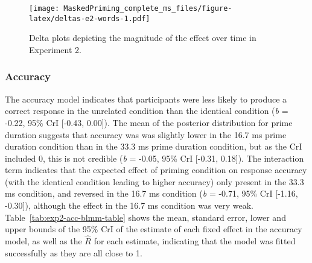 \documentclass[
  english,
  man,floatsintext]{apa6}
\begin{document}
\begin{figure}
\centering
\texttt{[image: MaskedPriming\_complete\_ms\_files/figure-latex/deltas-e2-words-1.pdf]}
\caption{\label{fig:deltas-e2-words}Delta plots depicting the magnitude of the effect over time in Experiment 2.}
\end{figure}

\hypertarget{accuracy-1}{%
\subsubsection{Accuracy}\label{accuracy-1}}

The accuracy model indicates that participants were less likely to produce a correct response in the unrelated condition than the identical condition (\emph{b} = -0.22, 95\% CrI {[}-0.43, 0.00{]}). The mean of the posterior distribution for prime duration suggests that accuracy was was slightly lower in the 16.7 ms prime duration condition than in the 33.3 ms prime duration condition, but as the CrI included 0, this is not credible (\emph{b} = -0.05, 95\% CrI {[}-0.31, 0.18{]}). The interaction term indicates that the expected effect of priming condition on response accuracy (with the identical condition leading to higher accuracy) only present in the 33.3 ms condition, and reversed in the 16.7 ms condition (\emph{b} = -0.71, 95\% CrI {[}-1.16, -0.30{]}), although the effect in the 16.7 ms condition was very weak. Table~\ref{tab:exp2-acc-blmm-table} shows the mean, standard error, lower and upper bounds of the 95\% CrI of the estimate of each fixed effect in the accuracy model, as well as the \(\hat{R}\) for each estimate, indicating that the model was fitted successfully as they are all close to 1.
\end{document}
